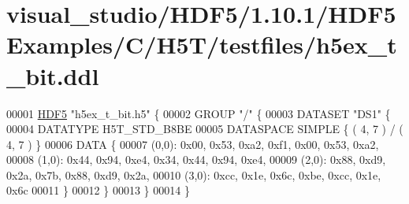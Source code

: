 \hypertarget{visual__studio_2_h_d_f5_21_810_81_2_h_d_f5_examples_2_c_2_h5_t_2testfiles_2h5ex__t__bit_8ddl_source}{}\section{visual\+\_\+studio/\+H\+D\+F5/1.10.1/\+H\+D\+F5\+Examples/\+C/\+H5\+T/testfiles/h5ex\+\_\+t\+\_\+bit.ddl}
\label{visual__studio_2_h_d_f5_21_810_81_2_h_d_f5_examples_2_c_2_h5_t_2testfiles_2h5ex__t__bit_8ddl_source}

\begin{DoxyCode}
00001 \hyperlink{namespace_h_d_f5}{HDF5} \textcolor{stringliteral}{"h5ex\_t\_bit.h5"} \{
00002 GROUP \textcolor{stringliteral}{"/"} \{
00003    DATASET \textcolor{stringliteral}{"DS1"} \{
00004       DATATYPE  H5T\_STD\_B8BE
00005       DATASPACE  SIMPLE \{ ( 4, 7 ) / ( 4, 7 ) \}
00006       DATA \{
00007       (0,0): 0x00, 0x53, 0xa2, 0xf1, 0x00, 0x53, 0xa2,
00008       (1,0): 0x44, 0x94, 0xe4, 0x34, 0x44, 0x94, 0xe4,
00009       (2,0): 0x88, 0xd9, 0x2a, 0x7b, 0x88, 0xd9, 0x2a,
00010       (3,0): 0xcc, 0x1e, 0x6c, 0xbe, 0xcc, 0x1e, 0x6c
00011       \}
00012    \}
00013 \}
00014 \}
\end{DoxyCode}

